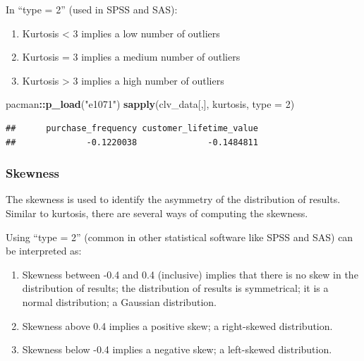 \documentclass[
]{article}
\newenvironment{Shaded}{\begin{snugshade}}{\end{snugshade}}
\newcommand{\AttributeTok}[1]{\textcolor[rgb]{0.13,0.29,0.53}{#1}}
\newcommand{\DecValTok}[1]{\textcolor[rgb]{0.00,0.00,0.81}{#1}}
\newcommand{\FunctionTok}[1]{\textcolor[rgb]{0.13,0.29,0.53}{\textbf{#1}}}
\newcommand{\NormalTok}[1]{#1}
\newcommand{\SpecialCharTok}[1]{\textcolor[rgb]{0.81,0.36,0.00}{\textbf{#1}}}
\newcommand{\StringTok}[1]{\textcolor[rgb]{0.31,0.60,0.02}{#1}}
\begin{document}
In ``type = 2'' (used in SPSS and SAS):

\begin{enumerate}
\def\labelenumi{\arabic{enumi}.}
\item
  Kurtosis \textless{} 3 implies a low number of outliers
\item
  Kurtosis = 3 implies a medium number of outliers
\item
  Kurtosis \textgreater{} 3 implies a high number of outliers
\end{enumerate}

\begin{Shaded}
\begin{Highlighting}[]
\NormalTok{pacman}\SpecialCharTok{::}\FunctionTok{p\_load}\NormalTok{(}\StringTok{"e1071"}\NormalTok{)}
\FunctionTok{sapply}\NormalTok{(clv\_data[,],  kurtosis, }\AttributeTok{type =} \DecValTok{2}\NormalTok{)}
\end{Highlighting}
\end{Shaded}

\begin{verbatim}
##      purchase_frequency customer_lifetime_value 
##              -0.1220038              -0.1484811
\end{verbatim}

\subsubsection{\texorpdfstring{\textbf{Skewness}}{Skewness}}\label{skewness}

The skewness is used to identify the asymmetry of the distribution of
results. Similar to kurtosis, there are several ways of computing the
skewness.

Using ``type = 2'' (common in other statistical software like SPSS and
SAS) can be interpreted as:

\begin{enumerate}
\def\labelenumi{\arabic{enumi}.}
\item
  Skewness between -0.4 and 0.4 (inclusive) implies that there is no
  skew in the distribution of results; the distribution of results is
  symmetrical; it is a normal distribution; a Gaussian distribution.
\item
  Skewness above 0.4 implies a positive skew; a right-skewed
  distribution.
\item
  Skewness below -0.4 implies a negative skew; a left-skewed
  distribution.
\end{enumerate}
\end{document}

